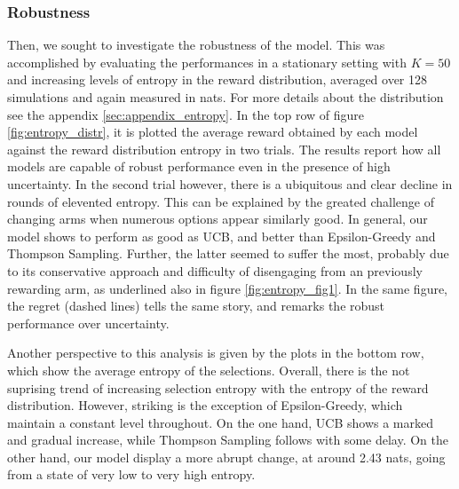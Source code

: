 \subsubsection{Robustness}

\noindent Then, we sought to investigate the robustness of the model.
This was accomplished by evaluating the performances in a stationary setting with $K=50$ and increasing levels of entropy in the reward distribution, averaged over 128 simulations and again measured in nats.
For more details about the distribution see the appendix \ref{sec:appendix_entropy}.
In the top row of figure \ref{fig:entropy_distr}, it is plotted the average reward obtained by each model against the reward distribution entropy in two trials.
The results report how all models are capable of robust performance even in the presence of high uncertainty.
In the second trial however, there is a ubiquitous and clear decline in rounds of elevented entropy. This can be explained by the greated challenge of changing arms when numerous options appear similarly good.
In general, our model shows to perform as good as UCB, and better than Epsilon-Greedy and Thompson Sampling.
Further, the latter seemed to suffer the most, probably due to its conservative approach and difficulty of disengaging from an previously rewarding arm, as underlined also in figure \ref{fig:entropy_fig1}.
In the same figure, the regret (dashed lines) tells the same story, and remarks the robust performance over uncertainty.

Another perspective to this analysis is given by the plots in the bottom row, which show the average entropy of the selections.
Overall, there is the not suprising trend of increasing selection entropy with the entropy of the reward distribution. However, striking is the exception of Epsilon-Greedy, which maintain a constant level throughout.
On the one hand, UCB shows a marked and gradual increase, while Thompson Sampling follows with some delay.
On the other hand, our model display a more abrupt change, at around 2.43 nats, going from a state of very low to very high entropy.


